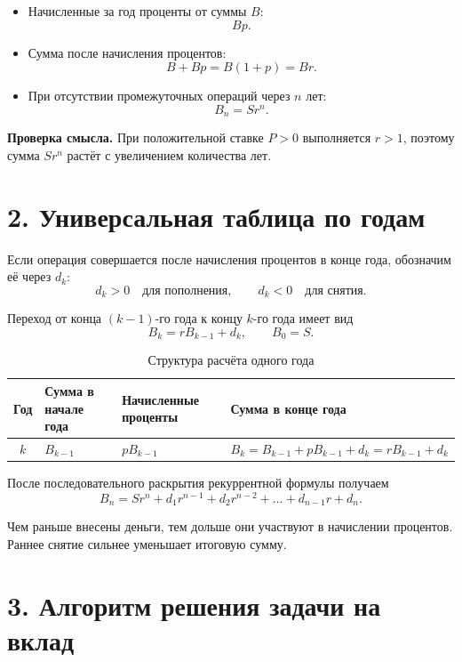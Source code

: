 \documentclass[a4paper,12pt]{article}
\newcommand{\key}[1]{\textcolor{darkaccent}{\textbf{#1}}}
\begin{document}
\begin{itemize}
  \item Начисленные за год проценты от суммы \(B\):
  \[
    Bp.
  \]

  \item Сумма после начисления процентов:
  \[
    B+Bp=B(1+p)=Br.
  \]

  \item При отсутствии промежуточных операций через \(n\) лет:
  \[
    \boxed{B_n=Sr^n}.
  \]
\end{itemize}

\key{Проверка смысла.}
При положительной ставке \(P>0\) выполняется \(r>1\), поэтому сумма
\(Sr^n\) растёт с увеличением количества лет.

\section*{2. Универсальная таблица по годам}

Если операция совершается после начисления процентов в конце года,
обозначим её через \(d_k\):
\[
  d_k>0
  \quad \text{для пополнения},
  \qquad
  d_k<0
  \quad \text{для снятия}.
\]

Переход от конца \((k-1)\)-го года к концу \(k\)-го года имеет вид
\[
  \boxed{B_k=rB_{k-1}+d_k},
  \qquad
  B_0=S.
\]

\begin{table}[ht]
  \centering
  \caption{Структура расчёта одного года}
  \renewcommand{\arraystretch}{1.35}
  \begin{tabularx}{\linewidth}{@{}cXXX@{}}
    \toprule
    Год
    &
    Сумма в начале года
    &
    Начисленные проценты
    &
    Сумма в конце года
    \\
    \midrule
    \(k\)
    &
    \(B_{k-1}\)
    &
    \(pB_{k-1}\)
    &
    \(B_k=B_{k-1}+pB_{k-1}+d_k=rB_{k-1}+d_k\)
    \\
    \bottomrule
  \end{tabularx}
\end{table}

После последовательного раскрытия рекуррентной формулы получаем
\[
  \boxed{
    B_n
    =
    Sr^n+d_1r^{n-1}+d_2r^{n-2}
    +\dots+d_{n-1}r+d_n
  }.
\]

Чем раньше внесены деньги, тем дольше они участвуют в начислении
процентов. Раннее снятие сильнее уменьшает итоговую сумму.

\section*{3. Алгоритм решения задачи на вклад}
\end{document}
